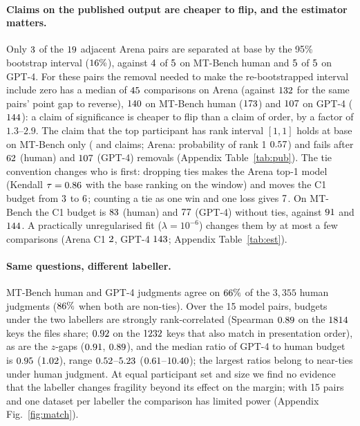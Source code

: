 \documentclass{article}
\begin{document}
\paragraph{Claims on the published output are cheaper to flip, and the estimator matters.} Only $3$ of the $19$ adjacent Arena pairs are separated at base by the 95\% bootstrap interval ($16\%$), against $4$ of $5$ on MT-Bench human and $5$ of $5$ on GPT-4. For these pairs the removal needed to make the re-bootstrapped interval include zero has a median of $45$ comparisons on Arena (against $132$ for the same pairs' point gap to reverse), $140$ on MT-Bench human ($173$) and $107$ on GPT-4 ($144$): a claim of significance is cheaper to flip than a claim of order, by a factor of $1.3$--$2.9$. The claim that the top participant has rank interval $[1,1]$ holds at base on MT-Bench only (\pubMTHCprime{} and \pubMTGCprime{} claims; Arena: probability of rank 1 $0.57$) and fails after $62$ (human) and $107$ (GPT-4) removals (Appendix Table~\ref{tab:pub}). The tie convention changes who is first: dropping ties makes \texttt{\estArenaDropTiesTop} the Arena top-1 model (Kendall $\tau=0.86$ with the base ranking on the window) and moves the C1 budget from $3$ to $6$; counting a tie as one win and one loss gives $7$. On MT-Bench the C1 budget is $83$ (human) and $77$ (GPT-4) without ties, against $91$ and $144$. A practically unregularised fit ($\lambda=10^{-6}$) changes them by at most a few comparisons (Arena C1 $2$, GPT-4 $143$; Appendix Table~\ref{tab:est}).

\paragraph{Same questions, different labeller.} MT-Bench human and GPT-4 judgments agree on $66\%$ of the $3{,}355$ human judgments ($86\%$ when both are non-ties). Over the 15 model pairs, budgets under the two labellers are strongly rank-correlated (Spearman $0.89$ on the $1814$ keys the files share; $0.92$ on the $1232$ keys that also match in presentation order), as are the $z$-gaps ($0.91$, $0.89$), and the median ratio of GPT-4 to human budget is $0.95$ ($1.02$), range $0.52$--$5.23$ ($0.61$--$10.40$); the largest ratios belong to near-ties under human judgment. At equal participant set and size we find no evidence that the labeller changes fragility beyond its effect on the margin; with 15 pairs and one dataset per labeller the comparison has limited power (Appendix Fig.~\ref{fig:match}).
\end{document}

